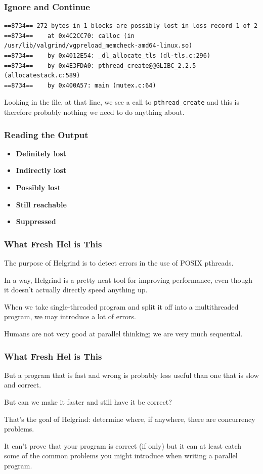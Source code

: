 \begin{frame}[fragile]
\frametitle{Ignore and Continue}
{\scriptsize
\begin{verbatim}
==8734== 272 bytes in 1 blocks are possibly lost in loss record 1 of 2
==8734==    at 0x4C2CC70: calloc (in /usr/lib/valgrind/vgpreload_memcheck-amd64-linux.so)
==8734==    by 0x4012E54: _dl_allocate_tls (dl-tls.c:296)
==8734==    by 0x4E3FDA0: pthread_create@@GLIBC_2.2.5 (allocatestack.c:589)
==8734==    by 0x400A57: main (mutex.c:64)
\end{verbatim}
}

Looking in the file, at that line, we see a call to \texttt{pthread\_create} and this is therefore probably nothing we need to do anything about. 


\end{frame}

\begin{frame}
\frametitle{Reading the Output}

\begin{itemize}
	\item \textbf{Definitely lost}
	\item \textbf{Indirectly lost}
	\item \textbf{Possibly lost}
	\item \textbf{Still reachable}
	\item \textbf{Suppressed}
\end{itemize}



\end{frame}

\begin{frame}
\frametitle{What Fresh Hel is This}

The purpose of Helgrind is to detect errors in the use of POSIX pthreads. 

In a way, Helgrind is a pretty neat tool for improving performance, even though it doesn't actually directly speed anything up. 

When we take single-threaded program and split it off into a multithreaded program, we may introduce a lot of errors.

Humans are not very good at parallel thinking; we are very much sequential.

\end{frame}

\begin{frame}
\frametitle{What Fresh Hel is This}

But a program that is fast and wrong is probably less useful than one that is slow and correct. 

But can we make it faster and still have it be correct? 

That's the goal of Helgrind: determine where, if anywhere, there are concurrency problems. 

It can't prove that your program is correct (if only) but it can at least catch some of the common problems you might introduce when writing a parallel program.

\end{frame}

